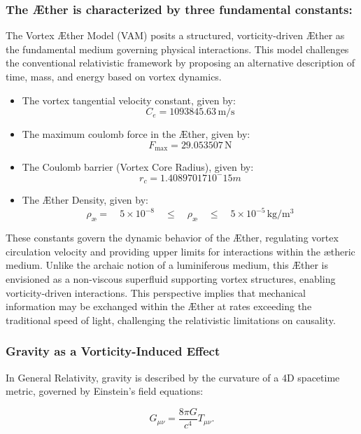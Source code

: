 \subsubsection*{The Æther is characterized by three fundamental constants:}\label{subsec:the-ae-ther-is-characterized-by-three-fundamental-constants:}

The Vortex Æther Model (VAM) posits a structured, vorticity-driven Æther as the fundamental medium governing physical interactions.
This model challenges the conventional relativistic framework by proposing an alternative description of time, mass, and energy based on vortex dynamics.

\begin{itemize}
    \item The vortex tangential velocity constant, given by: \[C_e = 1093845.63 \, \mathrm{m/s}\]
    \item The maximum coulomb force in the Æther, given by:\[F_\text{max} = 29.053507 \, \mathrm{N}\]
    \item The Coulomb barrier (Vortex Core Radius), given by: \[r_c = 1.40897017 10^-15 m\]
    \item The Æther Density, given by: \[\rho_\text{\ae} = \quad 5 \times 10^{-8} \quad \leq \quad \rho_\text{\ae} \quad \leq \quad 5 \times 10^{-5} \, \mathrm{kg/m^3}\]
\end{itemize}

These constants govern the dynamic behavior of the Æther, regulating vortex circulation velocity and providing upper limits for interactions within the ætheric medium.
Unlike the archaic notion of a luminiferous medium, this Æther is envisioned as a non-viscous superfluid supporting vortex structures, enabling vorticity-driven interactions.
This perspective implies that mechanical information may be exchanged within the Æther at rates exceeding the traditional speed of light, challenging the relativistic limitations on causality.


    \subsubsection*{Gravity as a Vorticity-Induced Effect}

    In General Relativity, gravity is described by the curvature of a 4D spacetime metric, governed by Einstein’s field equations:

    \begin{equation*}
        G_{\mu\nu} = \frac{8\pi G}{c^4} T_{\mu\nu}.
    \end{equation*}

